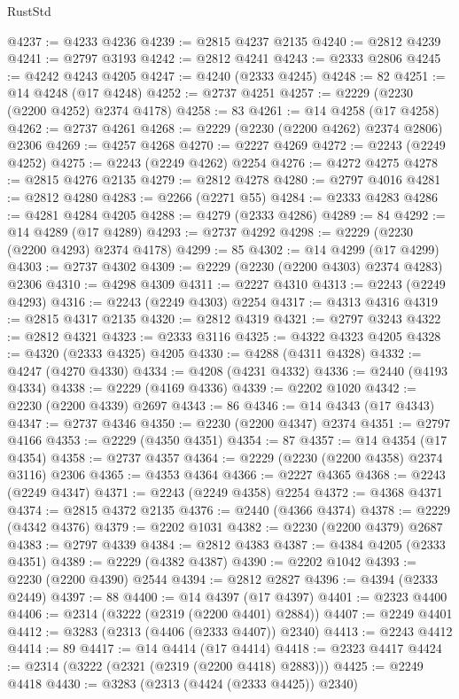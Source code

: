 \begin{lexlean}{RustStd}
\begin{coremodule}
@4237 := @4233 @4236
@4239 := @2815 @4237 @2135
@4240 := @2812 @4239
@4241 := @2797 @3193
@4242 := @2812 @4241
@4243 := @2333 @2806
@4245 := @4242 @4243 @4205
@4247 := @4240 (@2333 @4245)
@4248 := 82
@4251 := @14 @4248 (@17 @4248)
@4252 := @2737 @4251
@4257 := @2229 (@2230 (@2200 @4252) @2374 @4178)
@4258 := 83
@4261 := @14 @4258 (@17 @4258)
@4262 := @2737 @4261
@4268 := @2229 (@2230 (@2200 @4262) @2374 @2806) @2306
@4269 := @4257 @4268
@4270 := @2227 @4269
@4272 := @2243 (@2249 @4252)
@4275 := @2243 (@2249 @4262) @2254
@4276 := @4272 @4275
@4278 := @2815 @4276 @2135
@4279 := @2812 @4278
@4280 := @2797 @4016
@4281 := @2812 @4280
@4283 := @2266 (@2271 @55)
@4284 := @2333 @4283
@4286 := @4281 @4284 @4205
@4288 := @4279 (@2333 @4286)
@4289 := 84
@4292 := @14 @4289 (@17 @4289)
@4293 := @2737 @4292
@4298 := @2229 (@2230 (@2200 @4293) @2374 @4178)
@4299 := 85
@4302 := @14 @4299 (@17 @4299)
@4303 := @2737 @4302
@4309 := @2229 (@2230 (@2200 @4303) @2374 @4283) @2306
@4310 := @4298 @4309
@4311 := @2227 @4310
@4313 := @2243 (@2249 @4293)
@4316 := @2243 (@2249 @4303) @2254
@4317 := @4313 @4316
@4319 := @2815 @4317 @2135
@4320 := @2812 @4319
@4321 := @2797 @3243
@4322 := @2812 @4321
@4323 := @2333 @3116
@4325 := @4322 @4323 @4205
@4328 := @4320 (@2333 @4325) @4205
@4330 := @4288 (@4311 @4328)
@4332 := @4247 (@4270 @4330)
@4334 := @4208 (@4231 @4332)
@4336 := @2440 (@4193 @4334)
@4338 := @2229 (@4169 @4336)
@4339 := @2202 @1020
@4342 := @2230 (@2200 @4339) @2697
@4343 := 86
@4346 := @14 @4343 (@17 @4343)
@4347 := @2737 @4346
@4350 := @2230 (@2200 @4347) @2374
@4351 := @2797 @4166
@4353 := @2229 (@4350 @4351)
@4354 := 87
@4357 := @14 @4354 (@17 @4354)
@4358 := @2737 @4357
@4364 := @2229 (@2230 (@2200 @4358) @2374 @3116) @2306
@4365 := @4353 @4364
@4366 := @2227 @4365
@4368 := @2243 (@2249 @4347)
@4371 := @2243 (@2249 @4358) @2254
@4372 := @4368 @4371
@4374 := @2815 @4372 @2135
@4376 := @2440 (@4366 @4374)
@4378 := @2229 (@4342 @4376)
@4379 := @2202 @1031
@4382 := @2230 (@2200 @4379) @2687
@4383 := @2797 @4339
@4384 := @2812 @4383
@4387 := @4384 @4205 (@2333 @4351)
@4389 := @2229 (@4382 @4387)
@4390 := @2202 @1042
@4393 := @2230 (@2200 @4390) @2544
@4394 := @2812 @2827
@4396 := @4394 (@2333 @2449)
@4397 := 88
@4400 := @14 @4397 (@17 @4397)
@4401 := @2323 @4400
@4406 := @2314 (@3222 (@2319 (@2200 @4401) @2884))
@4407 := @2249 @4401
@4412 := @3283 (@2313 (@4406 (@2333 @4407)) @2340)
@4413 := @2243 @4412
@4414 := 89
@4417 := @14 @4414 (@17 @4414)
@4418 := @2323 @4417
@4424 := @2314 (@3222 (@2321 (@2319 (@2200 @4418) @2883)))
@4425 := @2249 @4418
@4430 := @3283 (@2313 (@4424 (@2333 @4425)) @2340)

\end{coremodule}
\end{lexlean}
